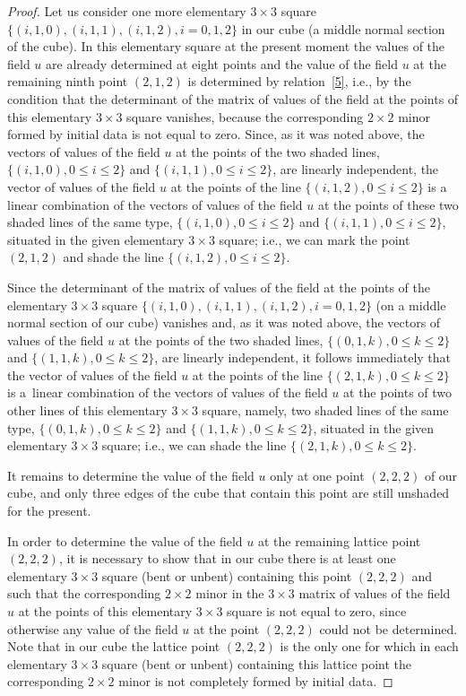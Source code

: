 \begin{proof}
Let us consider one more elementary $3 \times 3$ square $\{(i, 1,
0), (i, 1, 1), (i, 1, 2), i = 0, 1, 2\}$ in our cube (a middle
normal section of the cube). In this elementary square at the
present moment the values of the f\/ield $u$ are already determined at
eight points and the value of the f\/ield $u$ at the remaining ninth
point $(2, 1, 2)$ is determined by relation~\eqref{5}, i.e.,
by the condition that the determinant of the matrix of values of the
f\/ield at the points of this elementary $3 \times 3$ square vanishes,
because the corresponding $2 \times 2$ minor formed by initial data
is not equal to zero. Since, as it was noted above, the vectors of
values of the f\/ield $u$ at the points of the two shaded lines,
$\{(i, 1, 0), 0 \leq i \leq 2\}$ and $\{(i, 1, 1), 0 \leq i \leq
2\}$, are linearly independent, the vector of values of the f\/ield
$u$ at the points of the line $\{(i, 1, 2), 0 \leq i \leq 2\}$ is a
linear combination of the vectors of values of the f\/ield $u$ at the
points of these two shaded lines of the same type, $\{(i, 1, 0), 0
\leq i \leq 2\}$ and $\{(i, 1, 1), 0 \leq i \leq 2\}$, situated in
the given elementary $3 \times 3$ square; i.e., we can mark the
point $(2, 1, 2)$ and shade the line $\{(i, 1, 2), 0 \leq i \leq
2\}$.




Since the determinant of the matrix of values of the f\/ield at the
points of the elementary $3 \times 3$ square $\{(i, 1, 0), (i, 1,
1), (i, 1, 2), i = 0, 1, 2\}$ (on a middle normal section of our
cube) vanishes and, as it was noted above, the vectors of values of
the f\/ield $u$ at the points of the two shaded lines, $\{(0, 1, k), 0
\leq k \leq 2\}$ and $\{(1, 1, k), 0 \leq k \leq 2\}$, are linearly
independent, it follows immediately that the vector of values of the
f\/ield $u$ at the points of the line $\{(2, 1, k), 0 \leq k \leq 2\}$
is a~linear combination of the vectors of values of the f\/ield $u$ at
the points of two other lines of this elementary $3 \times 3$
square, namely, two shaded lines of the same type, $\{(0, 1, k), 0
\leq k \leq 2\}$ and $\{(1, 1, k), 0 \leq k \leq 2\}$, situated in
the given elementary $3 \times 3$ square; i.e., we can shade the
line $\{(2, 1, k), 0 \leq k \leq 2\}$.


It remains to determine the value of the f\/ield $u$ only at one point
$(2, 2, 2)$ of our cube, and only three edges of the cube that
contain this point are still unshaded for the present.


In order to determine the value of the f\/ield $u$ at the remaining
lattice point $(2, 2, 2)$, it is necessary to show that in our cube
there is at least one elementary $3 \times 3$ square (bent or
unbent) containing this point $(2, 2, 2)$ and such that the
corresponding $2 \times 2$ minor in the $3 \times 3$ matrix of
values of the f\/ield $u$ at the points of this elementary $3 \times
3$ square is not equal to zero, since otherwise any value of the
f\/ield $u$ at the point $(2, 2, 2)$ could not be determined. Note
that in our cube the lattice point $(2, 2, 2)$ is the only one for
which in each elementary $3 \times 3$ square (bent or unbent)
containing this lattice point the corresponding $2 \times 2$ minor
is not completely formed by initial data.



\end{proof}
